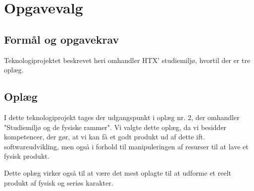 \section{Opgavevalg \label{sec:opgavevalg}}
    \subsection{Formål og opgavekrav}
        Teknologiprojektet beskrevet heri omhandler HTX' studiemiljø, hvortil der er tre oplæg.  
    \subsection{Oplæg}
        I dette teknologiprojekt tages der udgangspunkt i oplæg nr. 2, der omhandler "Studiemiljø og de fysiske rammer".
        Vi valgte dette oplæg, da vi besidder kompetencer, der gør, at vi kan få et godt produkt ud af dette ift. softwareudvikling, 
        men også i forhold til manipuleringen af resurser til at lave et fysisk produkt.

        Dette oplæg virker også til at være det mest oplagte til at udforme et reelt produkt af fysisk og seriøs karakter.